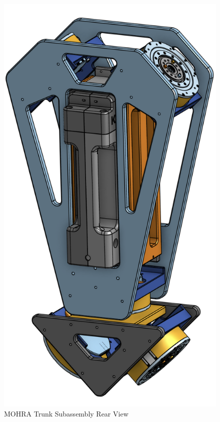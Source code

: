 \documentclass{article}
\begin{document}
\begin{figure}[H]
    \centering
    \includegraphics[scale=1]{assets/Design Presentation/Trunk Rear View.png}
    \caption{MOHRA Trunk Subassembly Rear View}
    \label{fig:enter-label}
\end{figure}
\end{document}
